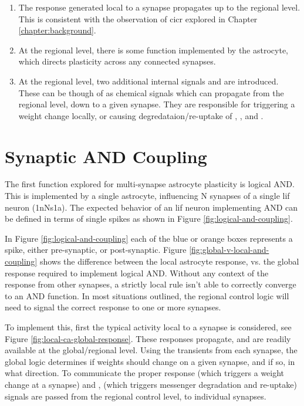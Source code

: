 \begin{enumerate}
\item The \ca response generated local to a synapse propagates up to the
  regional level. This is consistent with the observation of \gls{cicr} explored in
  Chapter \ref{chapter:background}.
\item At the regional level, there is some function implemented by the
  astrocyte, which directs plasticity across any connected synapses.
\item At the regional level, two additional internal signals \dser and
  \serca are introduced. These can be though of as chemical signals which can
  propagate from the regional level, down to a given synapse. They are
  responsible for triggering a weight change locally, or causing
  degredataion/re-uptake of \ipt, \kp, and \ca.
\end{enumerate}


\section{Synaptic AND Coupling}
The first function explored for multi-synapse astrocyte plasticity is logical
AND. This is implemented by a single astrocyte, influencing N synapses of a
single \gls{lif} neuron (1nNs1a). The expected behavior of an \gls{lif} neuron implementing
AND can be defined in terms of single spikes as shown in Figure
\ref{fig:logical-and-coupling}.


In Figure \ref{fig:logical-and-coupling} each of the blue or orange boxes
represents a spike, either pre-synaptic, or post-synaptic. Figure
\ref{fig:global-v-local-and-coupling} shows the difference between the local
astrocyte response, vs. the global response required to implement logical
AND. Without any context of the response from other synapses, a strictly local
rule isn't able to correctly converge to an AND function. In most situations
outlined, the regional control logic will need to signal the correct response to
one or more synapses.

To implement this, first the typical activity local to a synapse is considered,
see Figure \ref{fig:local-ca-global-response}. These \ca responses propagate,
and are readily available at the global/regional level. Using the \ca transients
from each synapse, the global logic determines if weights should change on a
given synapse, and if so, in what direction. To communicate the proper response
\dser (which triggers a weight change at a synapse) and \serca, (which triggers
messenger degradation and re-uptake) signals are passed from the regional
control level, to individual synapses.

